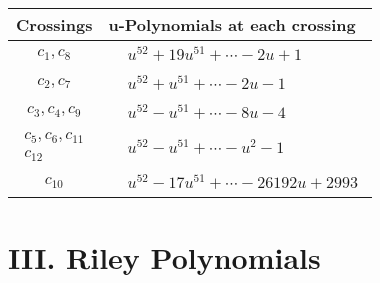 \documentclass[1p]{elsarticle_modified}
\theoremstyle{definition}
\begin{document}
\begin{tabular}{m{50pt}|m{274pt}}
Crossings & \hspace{64pt}u-Polynomials at each crossing \\
\hline $$\begin{aligned}c_{1},c_{8}\end{aligned}$$&$\begin{aligned}
&u^{52}+19 u^{51}+\cdots-2 u+1
\end{aligned}$\\
\hline $$\begin{aligned}c_{2},c_{7}\end{aligned}$$&$\begin{aligned}
&u^{52}+u^{51}+\cdots-2 u-1
\end{aligned}$\\
\hline $$\begin{aligned}c_{3},c_{4},c_{9}\end{aligned}$$&$\begin{aligned}
&u^{52}- u^{51}+\cdots-8 u-4
\end{aligned}$\\
\hline $$\begin{aligned}c_{5},c_{6},c_{11}\\c_{12}\end{aligned}$$&$\begin{aligned}
&u^{52}- u^{51}+\cdots- u^2-1
\end{aligned}$\\
\hline $$\begin{aligned}c_{10}\end{aligned}$$&$\begin{aligned}
&u^{52}-17 u^{51}+\cdots-26192 u+2993
\end{aligned}$\\
\hline
\end{tabular}\newpage\renewcommand{\arraystretch}{1}
\centering \section*{ III. Riley Polynomials}
\end{document}
